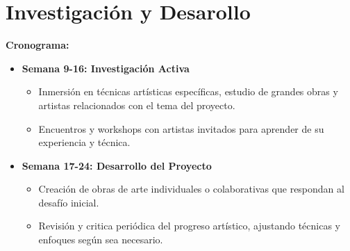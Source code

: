 \newpage
\section{Investigación y Desarollo}
{\large \textbf{Cronograma:}}
\begin{itemize}
  \item \textbf{Semana 9-16: Investigación Activa}
  \begin{itemize}
    \item Inmersión en técnicas artísticas específicas, estudio de grandes obras y artistas relacionados con el tema del proyecto.
    \item Encuentros y workshops con artistas invitados para aprender de su experiencia y técnica.
  \end{itemize}
  \item \textbf{Semana 17-24: Desarrollo del Proyecto}
  \begin{itemize}
    \item Creación de obras de arte individuales o colaborativas que respondan al desafío inicial.
    \item Revisión y critica periódica del progreso artístico, ajustando técnicas y enfoques según sea necesario.
  \end{itemize}
\end{itemize}

